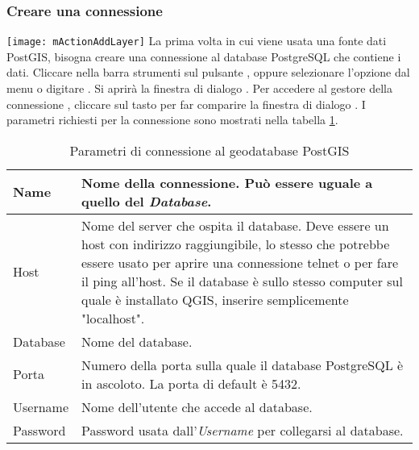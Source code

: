 \subsubsection{Creare una connessione}\label{sec:postgis_stored}

\texttt{[image: mActionAddLayer]} La prima volta in cui viene
usata una fonte dati PostGIS, bisogna creare una connessione al database
PostgreSQL che contiene i dati. Cliccare nella barra strumenti sul pulsante
, oppure selezionare l'opzione
 dal menu
 o digitare . 
Si aprirà  la finestra di dialogo . Per
accedere al gestore della connessione 
, cliccare sul tasto  per far comparire la finestra di
dialogo . I parametri richiesti
per la connessione sono mostrati nella tabella \ref{tab:postgis_connection_parms}.

\begin{table}[ht]
\centering
\caption{Parametri di connessione al geodatabase PostGIS}\label{tab:postgis_connection_parms}\medskip
 \begin{tabular}{|l|p{5in}|}
\hline Name & Nome della connessione. Può essere uguale a quello del \textsl{Database}.
\\
\hline Host \index{PostgreSQL!host}
& Nome del server che ospita il database. Deve essere un host con indirizzo
raggiungibile, lo stesso che potrebbe essere usato per aprire una connessione
telnet o per fare il ping all'host. Se il database è sullo stesso computer sul quale
è installato QGIS, inserire semplicemente "localhost". \\
\hline Database \index{PostgreSQL!database} & Nome del database.  \\
\hline Porta \index{PostgreSQL!porta}& Numero della porta sulla quale il
database PostgreSQL è in ascoloto. La porta di default è 5432.\\
\hline Username \index{PostgreSQL!nome utente}& Nome dell'utente che accede al
database. \\
\hline Password \index{PostgreSQL!password}& Password usata
dall'\textsl{Username} per collegarsi al database.\\
\hline
\end{tabular}
\end{table}

